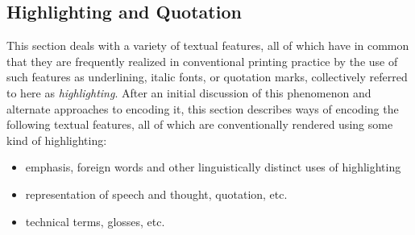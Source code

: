 \subsection[{Highlighting and Quotation}]{Highlighting and Quotation}\label{COHQ}\par
This section deals with a variety of textual features, all of which have in common that they are frequently realized in conventional printing practice by the use of such features as underlining, italic fonts, or quotation marks, collectively referred to here as \textit{highlighting}. After an initial discussion of this phenomenon and alternate approaches to encoding it, this section describes ways of encoding the following textual features, all of which are conventionally rendered using some kind of highlighting: \begin{itemize}
\item emphasis, foreign words and other linguistically distinct uses of highlighting
\item representation of speech and thought, quotation, etc.
\item technical terms, glosses, etc.
\end{itemize} 
